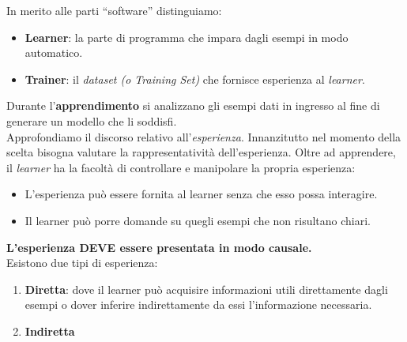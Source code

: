 In merito alle parti ``software'' distinguiamo:
\begin{itemize}
  \item \textbf{Learner}: la parte di programma che impara dagli esempi in modo
  automatico.
  \item \textbf{Trainer}: il \textit{dataset (o Training Set)} che fornisce esperienza al
  \textit{learner}.
\end{itemize}
Durante l'\textbf{apprendimento} si analizzano gli esempi dati in ingresso al fine di generare un modello che li soddisfi.\\
Approfondiamo il discorso relativo all'\textit{esperienza}. Innanzitutto nel
momento della scelta bisogna valutare la rappresentatività dell'esperienza. 
Oltre ad apprendere, il \textit{learner} ha la facoltà di controllare e manipolare la propria esperienza:
\begin{itemize}
  \item L'esperienza può essere fornita al learner senza che esso possa
  interagire.
  \item Il learner può porre domande su quegli esempi che non risultano chiari. 
\end{itemize}
\textbf{L'esperienza DEVE essere presentata in modo causale.}\\
Esistono due tipi di esperienza:
\begin{enumerate}
  \item \textbf{Diretta}: dove il learner può acquisire informazioni utili
  direttamente dagli esempi o dover inferire indirettamente da essi
  l’informazione necessaria.
  \item \textbf{Indiretta}
\end{enumerate}
\newpage
